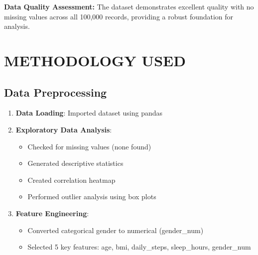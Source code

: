 \documentclass[12pt,a4paper]{article}
\begin{document}
\begin{successbox}
\textbf{Data Quality Assessment:} The dataset demonstrates excellent quality with no missing values across all 100,000 records, providing a robust foundation for analysis.
\end{successbox}

\section{METHODOLOGY USED}

\subsection{Data Preprocessing}
\begin{enumerate}
    \item \textbf{Data Loading}: Imported dataset using pandas
    \item \textbf{Exploratory Data Analysis}: 
    \begin{itemize}
        \item Checked for missing values (none found)
        \item Generated descriptive statistics
        \item Created correlation heatmap
        \item Performed outlier analysis using box plots
    \end{itemize}
    \item \textbf{Feature Engineering}:
    \begin{itemize}
        \item Converted categorical gender to numerical (gender\_num)
        \item Selected 5 key features: age, bmi, daily\_steps, sleep\_hours, gender\_num
    \end{itemize}
\end{enumerate}
\end{document}
